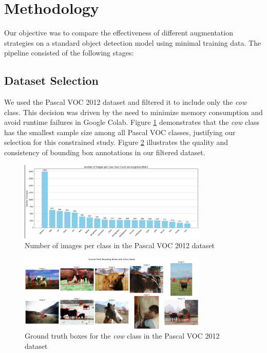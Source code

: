 \documentclass[12pt]{article}
\begin{document}
\section{Methodology}
Our objective was to compare the effectiveness of different augmentation strategies on a standard object detection model using minimal training data. The pipeline consisted of the following stages:

\subsection{Dataset Selection}
We used the Pascal VOC 2012 dataset and filtered it to include only the \emph{cow} class. This decision was driven by the need to minimize memory consumption and avoid runtime failures in Google Colab. Figure \ref{fig:n_images_per_class} demonstrates that the \emph{cow} class has the smallest sample size among all Pascal VOC classes, justifying our selection for this constrained study. Figure \ref{fig:ground_truth_boxes} illustrates the quality and consistency of bounding box annotations in our filtered dataset.

\begin{figure}[H]
    \centering
    \includegraphics[width=0.8\textwidth]{n_images_per_class.png}
    \caption{Number of images per class in the Pascal VOC 2012 dataset}
    \label{fig:n_images_per_class}
\end{figure}

\begin{figure}[H]
    \centering
    \includegraphics[width=0.8\textwidth]{ground_truth_boxes.png}
    \caption{Ground truth boxes for the \emph{cow} class in the Pascal VOC 2012 dataset}
    \label{fig:ground_truth_boxes}
\end{figure}
\end{document}
